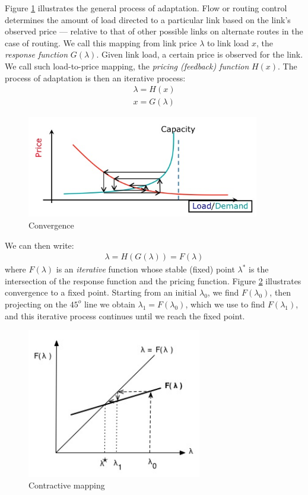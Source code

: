 \documentclass{article}
\begin{document}
Figure \ref{fig:routing-conv} illustrates the general process of adaptation.
Flow or routing control determines the amount of load directed to a particular link based
on the link's observed price --- 
relative to that of other possible links on alternate routes in the case of routing.
We call this mapping from link price $\lambda$ to link load $x$, 
the {\em response function} $G(\lambda)$.
Given link load, a certain price is observed for the link.
We call such load-to-price mapping, the {\em pricing (feedback) function} $H(x)$.
The process of adaptation is then an iterative process:
\begin{eqnarray*}
\lambda = H(x) \\
x = G(\lambda)
\end{eqnarray*}

\begin{figure}[htbp]
   \centering
   \includegraphics[width=4in]{figures/routing-conv.jpg} %
   \caption{Convergence}
   \label{fig:routing-conv}
\end{figure}


We can then write:
\begin{eqnarray*}
\lambda = H(G(\lambda))  = F(\lambda)
\end{eqnarray*}
where $F(\lambda)$ is an {\em iterative} function whose stable (fixed) point $\lambda^*$ is the intersection of
the response function and the pricing function.
Figure \ref{fig:contractive} illustrates convergence to a fixed point.
Starting from an initial $\lambda_0$,
we find $F(\lambda_0)$,
then projecting on the $45^{o}$ line we obtain $\lambda_1 = F(\lambda_0)$,
which we use to find $F(\lambda_1)$,
and this iterative process continues until we reach the fixed point.

\begin{figure}[htbp]
   \centering
   \includegraphics[width=3in]{figures/contractive.jpg} %
   \caption{Contractive mapping}
   \label{fig:contractive}
\end{figure}
\end{document}

